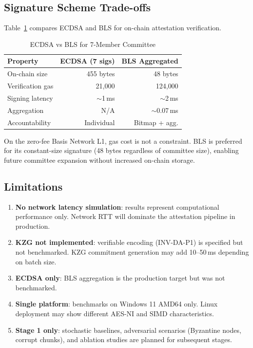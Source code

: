 \subsection{Signature Scheme Trade-offs}

Table~\ref{tab:signatures} compares ECDSA and BLS for on-chain
attestation verification.

\begin{table}[t]
\centering
\caption{ECDSA vs BLS for 7-Member Committee}
\label{tab:signatures}
\begin{tabular}{@{}lrr@{}}
\toprule
\textbf{Property} & \textbf{ECDSA (7 sigs)} & \textbf{BLS Aggregated} \\
\midrule
On-chain size        & 455 bytes     & 48 bytes     \\
Verification gas     & 21{,}000     & 124{,}000    \\
Signing latency      & $\sim$1\,ms  & $\sim$2\,ms  \\
Aggregation          & N/A          & $\sim$0.07\,ms \\
Accountability       & Individual   & Bitmap + agg. \\
\bottomrule
\end{tabular}
\end{table}

On the zero-fee Basis Network L1, gas cost is not a constraint. BLS is
preferred for its constant-size signature (48 bytes regardless of
committee size), enabling future committee expansion without increased
on-chain storage.

\subsection{Limitations}

\begin{enumerate}
  \item \textbf{No network latency simulation}: results represent
    computational performance only. Network RTT will dominate the
    attestation pipeline in production.
  \item \textbf{KZG not implemented}: verifiable encoding (INV-DA-P1) is
    specified but not benchmarked. KZG commitment generation may add
    10--50\,ms depending on batch size.
  \item \textbf{ECDSA only}: BLS aggregation is the production target
    but was not benchmarked.
  \item \textbf{Single platform}: benchmarks on Windows 11 AMD64 only.
    Linux deployment may show different AES-NI and SIMD characteristics.
  \item \textbf{Stage 1 only}: stochastic baselines, adversarial
    scenarios (Byzantine nodes, corrupt chunks), and ablation studies
    are planned for subsequent stages.
\end{enumerate}

